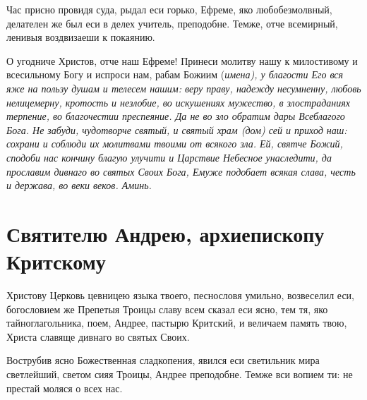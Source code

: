 

Час присно провидя суда, рыдал еси горько, Ефреме, яко любобезмолвный, делателен же был еси в делех учитель, преподобне. Темже, отче всемирный, ленивыя воздвизаеши к покаянию.




О угодниче Христов, отче наш Ефреме! Принеси молитву нашу к милостивому и всесильному Богу и испроси нам, рабам Божиим (\itshape имена\normalfont{}), у благости Его вся яже на пользу душам и телесем нашим: веру праву, надежду несумненну, любовь нелицемерну, кротость и незлобие, во искушениях мужество, в злостраданиях терпение, во благочестии преспеяние. Да не во зло обратим дары Всеблагого Бога. Не забуди, чудотворче святый, и святый храм (дом) сей и приход наш: сохрани и соблюди их молитвами твоими от всякого зла. Ей, святче Божий, сподоби нас кончину благую улучити и Царствие Небесное унаследити, да прославим дивнаго во святых Своих Бога, Емуже подобает всякая слава, честь и держава, во веки веков. Аминь.


\section{Святителю  Андрею, архиепископу Критскому}
 




Христову Церковь цевницею языка твоего, песнословя умильно, возвеселил еси, богословием же Препетыя Троицы славу всем сказал еси ясно, тем тя, яко тайноглагольника, поем, Андрее, пастырю Критский, и величаем память твою, Христа славяще дивнаго во святых Своих.




Вострубив ясно Божественная сладкопения, явился еси светильник мира светлейший, светом сияя Троицы, Андрее преподобне. Темже вси вопием ти: не престай моляся о всех нас.




